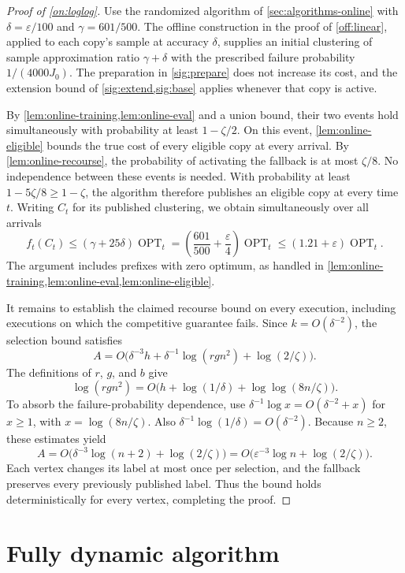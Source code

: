 \documentclass[11pt]{article}
\newcommand{\OPT}{\operatorname{OPT}}
\begin{document}
\begin{proof}[Proof of \cref{on:loglog}]
Use the randomized algorithm of \cref{sec:algorithms-online} with
$\delta=\varepsilon/100$ and $\gamma=601/500$. The offline
construction in the proof of \cref{off:linear}, applied to each
copy's sample at accuracy $\delta$, supplies an initial clustering
of sample approximation ratio $\gamma+\delta$ with the prescribed
failure probability $1/(4000J_0)$. The preparation in
\cref{sig:prepare} does not increase its cost, and the extension
bound of \cref{sig:extend,sig:base} applies whenever that copy is
active.

By \cref{lem:online-training,lem:online-eval} and a union bound,
their two events hold simultaneously with probability at least
$1-\zeta/2$. On this event, \cref{lem:online-eligible} bounds the
true cost of every eligible copy at every arrival. By
\cref{lem:online-recourse}, the probability of activating the
fallback is at most $\zeta/8$. No independence between these events
is needed. With probability at least $1-5\zeta/8\ge1-\zeta$, the
algorithm therefore publishes an eligible copy at every time $t$.
Writing $C_t$ for its published clustering, we obtain simultaneously
over all arrivals
\[
 f_t(C_t)\le(\gamma+25\delta)\OPT_t
 =\left(\frac{601}{500}+\frac{\varepsilon}{4}\right)\OPT_t
 \le(1.21+\varepsilon)\OPT_t.
\]
The argument includes prefixes with zero optimum, as handled in
\cref{lem:online-training,lem:online-eval,lem:online-eligible}.

It remains to establish the claimed recourse bound on every
execution, including executions on which the competitive guarantee
fails. Since $k=O(\delta^{-2})$, the selection bound satisfies
\[
 A=O\bigl(\delta^{-3}h+
           \delta^{-1}\log(rgn^2)+\log(2/\zeta)\bigr).
\]
The definitions of $r$, $g$, and $b$ give
\[
 \log(rgn^2)
 =O\bigl(h+\log(1/\delta)+\log\log(8n/\zeta)\bigr).
\]
To absorb the failure-probability dependence, use
$\delta^{-1}\log x=O(\delta^{-2}+x)$ for $x\ge1$, with
$x=\log(8n/\zeta)$. Also
$\delta^{-1}\log(1/\delta)=O(\delta^{-2})$. Because $n\ge2$,
these estimates yield
\[
 A=O\bigl(\delta^{-3}\log(n+2)+\log(2/\zeta)\bigr)
  =O\bigl(\varepsilon^{-3}\log n+\log(2/\zeta)\bigr).
\]
Each vertex changes its label at most once per selection, and the
fallback preserves every previously published label. Thus the bound
holds deterministically for every vertex, completing the proof.
\end{proof}


\section{Fully dynamic algorithm}
\label{sec:dyn-band}
\DynamicMain*
\end{document}
